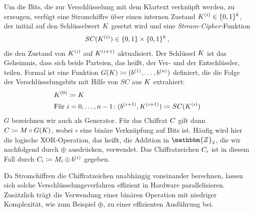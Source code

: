 Um die Bits, die zur Verschlüsselung mit dem Klartext verknüpft werden, zu erzeugen, verfügt eine Stromchiffre über einen internen Zustand $K^{(i)} \in \{0,1\}^k$, der initial auf den Schlüsselwert $K$ gesetzt wird und eine \emph{Stream-Cipher-}Funktion
\begin{align*}
	SC(K^{(i)}) \in \{0,1\} \times \{0,1\}^k\, ,
\end{align*}
die den Zustand von $K^{(i)}$ auf $K^{(i+1)}$ aktualisiert. Der Schlüssel $K$ ist das Geheimnis, dass sich beide Parteien, das heißt, der Ver- und der Entschlüssler, teilen. Formal ist eine Funktion $G(K) \coloneqq (b^{(1)},\dots,b^{(n)})$ definiert, die die Folge der Verschlüsselungsbits mit Hilfe von $SC$ aus $K$ extrahiert:
\begin{align*}
	&K^{(0)} \coloneqq K\\
	&\textnormal{Für } i = 0,\dots,n-1\colon (b^{(i+1)},K^{(i+1)}) \coloneqq SC(K^{(i)}) 
\end{align*}
$G$ bezeichnen wir auch als Generator. Für das Chiffrat $C$ gilt dann $C \coloneqq M \circ G(K)$, wobei $\circ$ eine binäre Verknüpfung auf Bits ist. Häufig wird hier die logische XOR-Operation, das heißt, die Addition in $\mathbbm{Z}_{2}$, die wir nachfolgend durch $\oplus$ ausdrücken, verwendet. Das Chiffratzeichen $C_{i}$ ist in diesem Fall durch $C_{i} \coloneqq M_{i} \oplus b^{(i)}$ gegeben. 

Da Stromchiffren die Chiffratzeichen unabhängig voneinander berechnen, lassen sich solche Verschlüsselungsverfahren effizient in Hardware parallelisieren. Zusätzlich trägt die Verwendung einer binären Operation mit niedriger Komplexität, wie zum Beispiel $\oplus$, zu einer effizienten Ausführung bei.

